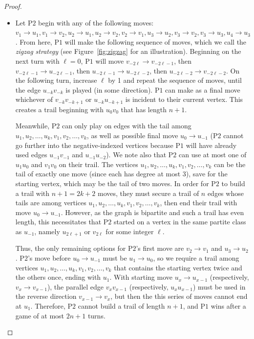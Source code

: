 \documentclass{article}
\theoremstyle{plain}
\theoremstyle{definition}
\def\pone{{\rm{P}\ensuremath{1}}}
\def\ptwo{{\rm{P}\ensuremath{2}}}
\def\ptwoposs{{\rm{P}\ensuremath{2}'s}}
\begin{document}
\begin{proof}
\begin{itemize}
\item [(vi)] Let \ptwo{} begin with any of the following moves: $v_{1} \to u_{1}, v_{1} \to v_{2}, u_{2} \to u_{1}, u_{2} \to v_{2}, v_{2} \to v_{1}, u_{3} \to u_{2}, v_{3} \to v_{2}, v_{3} \to u_{3}, u_{4} \to u_{3}$. From here, \pone{} will make the following sequence of moves, which we call the \emph{zigzag strategy} (see Figure~\ref{fig:zigzag} for an illustration). Beginning on the next turn with $\ell=0$, \pone{} will move $v_{-2\ell} \to v_{-2\ell -1}$, then $v_{-2\ell -1} \to u_{-2\ell-1}$, then $u_{-2\ell-1} \to u_{-2\ell-2}$, then $u_{-2\ell -2} \to v_{-2\ell -2}$. On the following turn, increase $\ell$ by 1 and repeat the sequence of moves, until the edge $u_{-k}v_{-k}$ is played (in some direction). \pone{} can make as a final move whichever of $v_{-k} v_{-k+1}$ or $u_{-k} u_{-k+1}$ is incident to their current vertex. This creates a trail beginning with $u_0 v_0$ that has length $n+1$. 

Meanwhile, \ptwo{} can only play on edges with the tail among $u_1,u_2,\dots,u_{k}, v_1,v_2,\dots,v_{k}$, as well as possible final move $u_0 \to u_{-1}$ (\ptwo{} cannot go further into the negative-indexed vertices because \pone{} will have already used edges $u_{-1}v_{-1}$ and $u_{-1}u_{-2}$). We note also that \ptwo{} can use at most one of $u_1u_0$ and $v_1v_0$ on their trail. The vertices $u_1,u_2,\dots,u_{k}, v_1,v_2,\dots,v_{k}$ can be the tail of exactly one move (since each has degree at most $3$), save for the starting vertex, which may be the tail of two moves. In order for \ptwo{} to build a trail with $n+1=2k+2$ moves, they must secure a trail of $n$ edges whose tails are among vertices $u_1,u_2,\dots,u_{k}, v_1,v_2,\dots,v_{k}$, then end their trail with move $u_0 \to u_{-1}$. However, as the graph is bipartite and such a trail has even length, this necessitates that \ptwo{} started on a vertex in the same partite class as $u_{-1}$, namely $u_{2\ell+1}$ or $v_{2\ell}$ for some integer $\ell$. 

Thus, the only remaining options for \ptwoposs{} first move are $v_2\to v_1$ and $u_3\to u_2$. \ptwoposs{} move before $u_0\to u_{-1}$ must be $u_1\to u_0$, so we require a trail among vertices $u_1,u_2,\dots,u_k, v_1,v_2,\dots,v_k$ that contains the starting vertex twice and the others once, ending with $u_{1}$.
With starting move $u_{x} \to u_{x-1}$ (respectively, $v_{x} \to v_{x-1}$), the parallel edge $v_{x}v_{x-1}$ (respectively, $u_{x}u_{x-1}$) must be used in the reverse direction $v_{x-1} \to v_{x}$, but then the this series of moves cannot end at $u_{1}$. Therefore, \ptwo{} cannot build a trail of length $n+1$, and \pone{} wins after a game of at most $2n+1$ turns.   


\end{itemize}
\end{proof}
\end{document}
